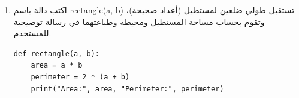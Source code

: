 \documentclass[14pt]{extarticle}
\begin{document}
\begin{enumerate}[itemsep=3em]
\ifwithsols
\begin{boxSolution}
\begin{enumerate}
    \item أحمد \textenglish{16}
    \item يقوم بتحويل القيمة المدخلة (نص) إلى عدد صحيح.
\end{enumerate}
\end{boxSolution}
\fi

\item
اكتب دالة باسم \textenglish{rectangle(a, b)} تستقبل طولي ضلعين لمستطيل (أعداد صحيحة)، وتقوم بحساب مساحة المستطيل ومحيطه وطباعتهما في رسالة توضيحية للمستخدم.

\ifwithsols
\begin{boxSolution}
\begin{english}
\begin{verbatim}
def rectangle(a, b):
    area = a * b
    perimeter = 2 * (a + b)
    print("Area:", area, "Perimeter:", perimeter)
\end{verbatim}
\end{english}
\end{boxSolution}
\fi

\end{enumerate}
\end{document}
